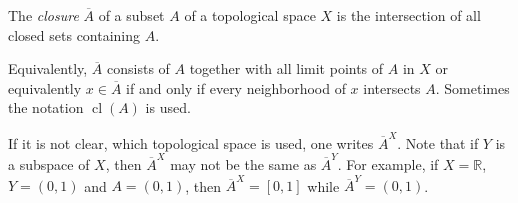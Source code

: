 \documentclass{article}
\begin{document}
The \emph{closure} $\overline{A}$ of a subset $A$ of a topological space $X$ is the intersection of all closed sets containing $A$.

Equivalently, $\overline{A}$ consists of $A$ together with all limit points of $A$ in $X$ or equivalently $x\in\overline{A}$ if and only if every neighborhood of $x$ intersects $A$. Sometimes the notation $\operatorname{cl}(A)$ is used.

If it is not clear, which topological space is used, one writes $\overline{A}^X$. Note that if $Y$ is a subspace of $X$, then $\overline{A}^X$ may not be the same as $\overline{A}^Y$.  For example, if $X=\mathbb{R}$, $Y=(0,1)$ and $A=(0,1)$, then $\overline{A}^X=[0,1]$ while $\overline{A}^Y=(0,1)$.
\end{document}
